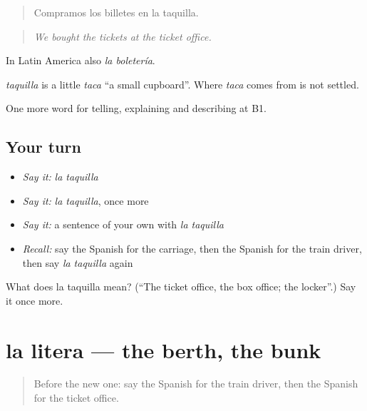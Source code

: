 \begin{quote}
Compramos los billetes en la taquilla.
\end{quote}

\begin{quote}
\emph{We bought the tickets at the ticket office.}
\end{quote}

In Latin America also \emph{la boletería}.

\begin{cousinweb}
\emph{taquilla} is a little \emph{taca} \textquotedblleft{}a small cupboard\textquotedblright{}. Where \emph{taca} comes from is not settled.
\end{cousinweb}

\begin{grammarlens}[title={What you've built}]
One more word for telling, explaining and describing at B1.
\end{grammarlens}

\subsection*{Your turn}
\begin{itemize}
\raggedright
  \item \emph{Say it:} \emph{la taquilla}
  \item \emph{Say it:} \emph{la taquilla}, once more
  \item \emph{Say it:} a sentence of your own with \emph{la taquilla}
  \item \emph{Recall:} say the Spanish for the carriage, then the Spanish for the train driver, then say \emph{la taquilla} again
\end{itemize}

\begin{tcolorbox}[breakable,colback=teal!4,colframe=teal!35!black,title={Before you move on}]
What does la taquilla mean? (\textquotedblleft{}The ticket office, the box office; the locker\textquotedblright{}.) Say it once more.
\end{tcolorbox}
\section[la litera]{la litera — the berth, the bunk}

\label{lesson:ES-C651-litera}



\begin{quote}
Before the new one: say the Spanish for the train driver, then the Spanish for the ticket office.
\end{quote}

